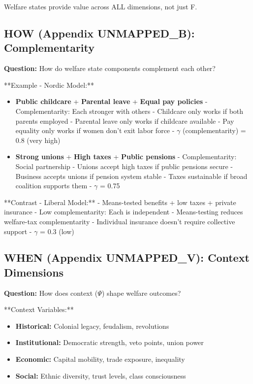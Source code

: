 Welfare states provide value across ALL dimensions, not just F.

\subsection{HOW (Appendix UNMAPPED_B): Complementarity}

\textbf{Question:} How do welfare state components complement each other?

**Example - Nordic Model:**
\begin{itemize}
\item \textbf{Public childcare} + \textbf{Parental leave} + \textbf{Equal pay policies}
   - Complementarity: Each stronger with others
   - Childcare only works if both parents employed
   - Parental leave only works if childcare available
   - Pay equality only works if women don't exit labor force
   - $\gamma$ (complementarity) = 0.8 (very high)

\item \textbf{Strong unions} + \textbf{High taxes} + \textbf{Public pensions}
   - Complementarity: Social partnership
   - Unions accept high taxes if public pensions secure
   - Business accepts unions if pension system stable
   - Taxes sustainable if broad coalition supports them
   - $\gamma$ = 0.75
\end{itemize}

**Contrast - Liberal Model:**
- Means-tested benefits + low taxes + private insurance
- Low complementarity: Each is independent
- Means-testing reduces welfare-tax complementarity
- Individual insurance doesn't require collective support
- $\gamma$ = 0.3 (low)

\subsection{WHEN (Appendix UNMAPPED_V): Context Dimensions}

\textbf{Question:} How does context ($\Psi$) shape welfare outcomes?

**Context Variables:**
\begin{itemize}
\item \textbf{Historical:} Colonial legacy, feudalism, revolutions
\item \textbf{Institutional:} Democratic strength, veto points, union power
\item \textbf{Economic:} Capital mobility, trade exposure, inequality
\item \textbf{Social:} Ethnic diversity, trust levels, class consciousness
\end{itemize}

